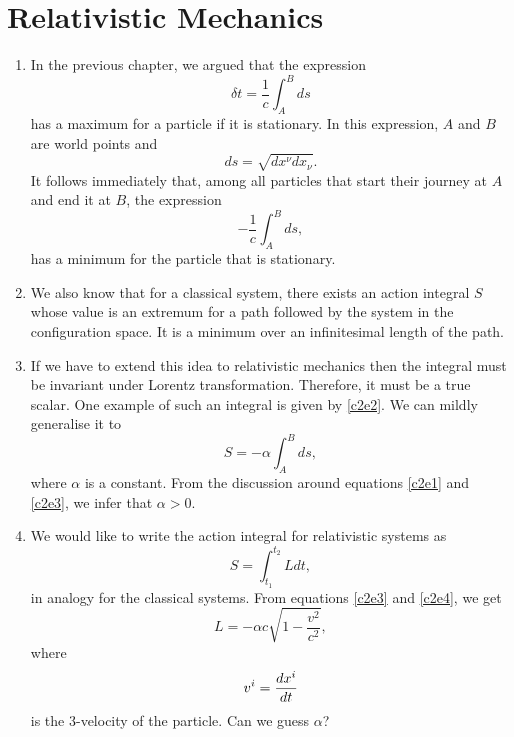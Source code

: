 \chapter{Relativistic Mechanics}\label{c2}
\begin{enumerate}
\item In the previous chapter, we argued that the expression
\begin{equation}\label{c2e1}
\delta t = \frac{1}{c}\int_A^B ds
\end{equation}
has a maximum for a particle if it is stationary. In this expression, $A$ and 
$B$ are world points and 
\[
ds = \sqrt{dx^\nu dx_\nu}.
\]
It follows immediately that, among all particles that start their journey at 
$A$ and end it at $B$, the expression
\begin{equation}\label{c2e2}
-\frac{1}{c}\int_A^B ds,
\end{equation}
has a minimum for the particle that is stationary.

\item We also know that for a classical system, there exists an action integral
$S$ whose value is an extremum for a path followed by the system in the 
configuration space. It is a minimum over an infinitesimal length of the path.

\item If we have to extend this idea to relativistic mechanics then the integral
must be invariant under Lorentz transformation. Therefore, it must be a true 
scalar. One example of such an integral is given by \eqref{c2e2}. We can mildly 
generalise it to
\begin{equation}\label{c2e3}
S = -\alpha \int_A^B ds,
\end{equation}
where $\alpha$ is a constant. From the discussion around equations \eqref{c2e1}
and \eqref{c2e3}, we infer that $\alpha > 0$.

\item We would like to write the action integral for relativistic systems as
\begin{equation}\label{c2e4}
S = \int_{t_1}^{t_2}Ldt,
\end{equation}
in analogy for the classical systems. From equations \eqref{c2e3} and 
\eqref{c2e4}, we get
\begin{equation}\label{c2e5}
L = -\alpha c\sqrt{1 - \frac{v^2}{c^2}},
\end{equation}
where
\[
v^i = \frac{d{x^i}}{d{t}}
\]
is the 3-velocity of the particle. Can we guess $\alpha$?


\end{enumerate}
